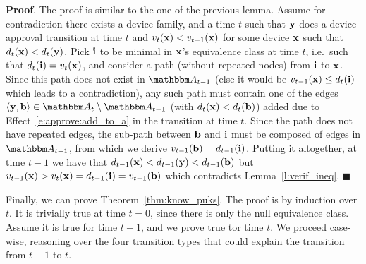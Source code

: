 \textbf{Proof}.
%
The proof is similar to the one of the previous lemma. Assume for contradiction there exists a
device family, and a time $t$ such that $\mathbf{y}$ does a device approval transition at time $t$ and
$v_{t}(\mathbf{x}) < v_{t-1}(\mathbf{x})$ for some device $\mathbf{x}$ such that $d_{t}(\mathbf{x}) <
d_{t}(\mathbf{y})$. Pick $\mathbf{i}$ to be minimal in $\mathbf{x}$'s equivalence class at time $t$,
i.e.\ such that $d_{t}(\mathbf{i}) = v_{t}(\mathbf{x})$, and consider a path (without repeated nodes) from
$\mathbf{i}$ to $\mathbf{x}$. Since this path does not exist in $\zset{A}_{t-1}$ (else it would be
$v_{t-1}(\mathbf{x}) \leq d_{t}(\mathbf{i})$ which leads to a contradiction), any such path must contain
one of the edges $\langle \zdev{y}, \zdev{b} \rangle \in \zset{A}_t \setminus \zset{A}_{t-1}$ (with
$d_{t}(\mathbf{x}) < d_{t}(\mathbf{b})$) added due to Effect~\ref{e:approve:add_to_a} in the
transition at time $t$. Since the path does not have repeated edges, the sub-path between $\mathbf{b}$
and $\mathbf{i}$ must be composed of edges in $\zset{A}_{t-1}$, from which we derive $v_{t-1}(\mathbf{b})
= d_{t-1}(\mathbf{i})$. Putting it altogether, at time $t-1$ we have that
$d_{t-1}(\mathbf{x})<d_{t-1}(\mathbf{y})<d_{t-1}(\mathbf{b})$ but $v_{t-1}(\mathbf{x}) > v_{t}(\mathbf{x}) =
d_{t-1}(\mathbf{i}) = v_{t-1}(\mathbf{b})$ which contradicts Lemma~\ref{l:verif_ineq}. $\blacksquare$

Finally, we can prove Theorem~\ref{thm:know_puks}. The proof is by induction over $t$. It is
trivially true at time $t=0$, since there is only the null equivalence class. Assume it is true for
time $t-1$, and we prove true tor time $t$. We proceed case-wise, reasoning over the four transition
types that could explain the transition from $t-1$ to $t$.

